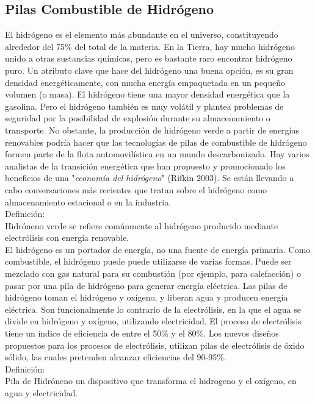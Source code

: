 \documentclass[runningheads]{llncs}
\begin{document}
\subsection{Pilas Combustible de Hidrógeno}
El hidrógeno es el elemento más abundante en el universo, constituyendo alrededor del 75\% del total de la materia. En la Tierra, hay mucho hidrógeno unido a otras sustancias químicas, pero es bastante raro encontrar hidrógeno puro. Un atributo clave que hace del hidrógeno una buena opción, es su gran densidad energéticamente, con mucha energía empaquetada en un pequeño volumen (o masa). El hidrógeno tiene una mayor densidad energética que la gasolina. Pero el hidrógeno también es muy volátil y plantea problemas de seguridad por la posibilidad de explosión durante su almacenamiento o transporte. No obstante, la producción de hidrógeno verde a partir de energías renovables podría hacer que las tecnologías de pilas de combustible de hidrógeno formen parte de la flota automovilística en un mundo descarbonizado. Hay varios analistas de la transición energética que han propuesto y promocionado los beneficios de una "\textit{economía del hidrógeno}" (Rifkin 2003). Se están llevando a cabo conversaciones más recientes que tratan sobre el hidrógeno como almacenamiento estacional o en la industria. \\

Definición: \\
Hidróneno verde se refiere comúnmente al hidrógeno producido mediante electrólisis con energía renovable. \\

El hidrógeno es un portador de energía, no una fuente de energía primaria. Como combustible, el hidrógeno puede puede utilizarse de varias formas. Puede ser mezclado con gas natural para su combustión (por ejemplo, para calefacción) o pasar por una pila de hidrógeno para generar energía eléctrica. Las pilas de hidrógeno toman el hidrógeno y oxígeno, y liberan agua y producen energía eléctrica. Son funcionalmente lo contrario de la electrólisis, en la que el agua se divide en hidrógeno y oxígeno, utilizando electricidad. El proceso de electrólisis tiene un índice de eficiencia de entre el 50\% y el 80\%. Los nuevos diseños propuestos para los procesos de electrólisis, utilizan pilas de electrólisis de óxido sólido, las cuales pretenden alcanzar eficiencias del 90-95\%. \\

Definición: \\
Pila de Hidróneno un dispositivo que transforma el hidrogeno y el oxígeno, en agua y electricidad. \\
\end{document}
